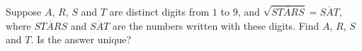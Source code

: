 Suppose $A$, $R$, $S$ and $T$ are distinct digits from $1$ to $9$, and $\sqrt{\overline{STARS}}=\overline{SAT}$, where $\overline{STARS}$ and $\overline{SAT}$ are the numbers written with these digits. Find $A$, $R$, $S$ and $T$. Is the answer unique?
